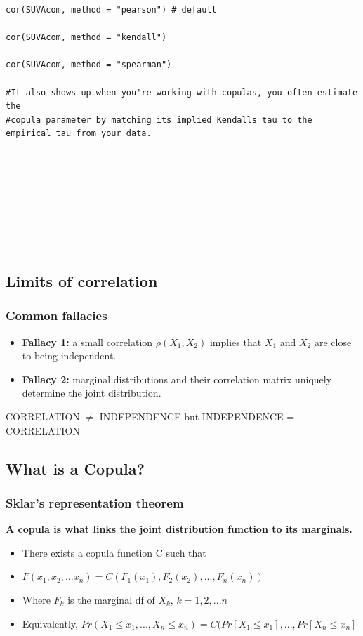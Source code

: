 \documentclass{article}
\begin{document}
\begin{lstlisting}
cor(SUVAcom, method = "pearson") # default

cor(SUVAcom, method = "kendall")

cor(SUVAcom, method = "spearman")

#It also shows up when you're working with copulas, you often estimate the 
#copula parameter by matching its implied Kendalls tau to the empirical tau from your data.









\end{lstlisting}


\subsection{Limits of correlation}

\subsubsection{Common fallacies}
\begin{itemize}
    \item \textbf{Fallacy 1:} a small correlation $\rho(X_1,X_2)$ implies that $X_1$ and $X_2$ are close to being independent.
    \item \textbf{Fallacy 2:} marginal distributions and their correlation matrix uniquely determine the joint distribution.
\end{itemize}

CORRELATION $\neq$ INDEPENDENCE but INDEPENDENCE = CORRELATION



\subsection{What is a Copula?}
\subsubsection{Sklar's representation theorem}

\textbf{A copula is what links the joint distribution function to its marginals.}

\begin{itemize}
    \item There exists a copula function C such that
    \item $F(x_1,x_2,...x_n) = C(F_1(x_1), F_2(x_2),...,F_n(x_n))$
    \item Where $F_k$ is the marginal df of $X_k$, $k = 1, 2,...n$
    \item Equivalently, $Pr(X_1 \leq x_1, ..., X_n \leq x_n) = C(Pr[X_1 \leq x_1], ..., Pr[X_n \leq x_n]$
\end{itemize}
\end{document}
